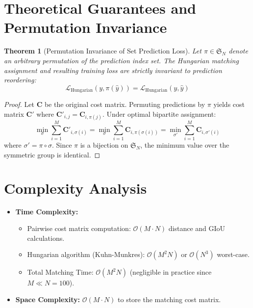 \documentclass[11pt,a4paper]{article}
\newtheorem{theorem}{Theorem}
\theoremstyle{definition}
\begin{document}
\section{Theoretical Guarantees and Permutation Invariance}

\begin{theorem}[Permutation Invariance of Set Prediction Loss]
\label{thm:permutation_invariance}
Let $\pi \in \mathfrak{S}_N$ denote an arbitrary permutation of the prediction index set. The Hungarian matching assignment and resulting training loss are strictly invariant to prediction reordering:
\begin{equation}
\mathcal{L}_{\text{Hungarian}}(y, \pi(\hat{y})) = \mathcal{L}_{\text{Hungarian}}(y, \hat{y})
\end{equation}
\end{theorem}

\begin{proof}
Let $\mathbf{C}$ be the original cost matrix. Permuting predictions by $\pi$ yields cost matrix $\mathbf{C}'$ where $\mathbf{C}'_{i, j} = \mathbf{C}_{i, \pi(j)}$. Under optimal bipartite assignment:
\begin{equation}
\min_{\sigma} \sum_{i=1}^M \mathbf{C}'_{i, \sigma(i)} = \min_{\sigma} \sum_{i=1}^M \mathbf{C}_{i, \pi(\sigma(i))} = \min_{\sigma'} \sum_{i=1}^M \mathbf{C}_{i, \sigma'(i)}
\end{equation}
where $\sigma' = \pi \circ \sigma$. Since $\pi$ is a bijection on $\mathfrak{S}_N$, the minimum value over the symmetric group is identical.
\end{proof}

\section{Complexity Analysis}

\begin{itemize}
    \item \textbf{Time Complexity:}
    \begin{itemize}
        \item Pairwise cost matrix computation: $\mathcal{O}(M \cdot N)$ distance and GIoU calculations.
        \item Hungarian algorithm (Kuhn-Munkres): $\mathcal{O}(M^2 N)$ or $\mathcal{O}(N^3)$ worst-case.
        \item Total Matching Time: $\mathcal{O}(M^2 N)$ (negligible in practice since $M \ll N = 100$).
    \end{itemize}
    \item \textbf{Space Complexity:} $\mathcal{O}(M \cdot N)$ to store the matching cost matrix.
\end{itemize}
\end{document}
